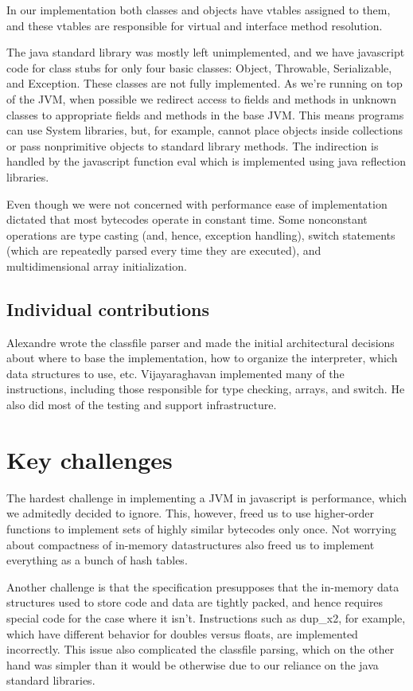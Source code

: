 \documentclass{article}
\begin{document}
In our implementation both classes and objects have vtables assigned
to them, and these vtables are responsible for virtual and interface
method resolution.

The java standard library was mostly left unimplemented, and we have
javascript code for class stubs for only four basic classes: Object,
Throwable, Serializable, and Exception. These classes are not fully
implemented. As we're running on top of the JVM, when possible we
redirect access to fields and methods in unknown classes to
appropriate fields and methods in the base JVM. This means programs
can use System libraries, but, for example, cannot place objects
inside collections or pass nonprimitive objects to standard library
methods. The indirection is handled by the javascript function eval
which is implemented using java reflection libraries.

Even though we were not concerned with performance ease of
implementation dictated that most bytecodes operate in constant
time. Some nonconstant operations are type casting (and, hence,
exception handling), switch statements (which are repeatedly
parsed every time they are executed), and multidimensional array
initialization.

\subsection{Individual contributions}
\label{sec:indiv-contr}

Alexandre wrote the classfile parser and made the initial
architectural decisions about where to base the implementation, how to
organize the interpreter, which data structures to use,
etc. Vijayaraghavan implemented many of the instructions, including
those responsible for type checking, arrays, and switch. He also did
most of the testing and support infrastructure.

\section{Key challenges}
\label{sec:key-challenges}

The hardest challenge in implementing a JVM in javascript is
performance, which we admitedly decided to ignore. This, however,
freed us to use higher-order functions to implement sets of highly
similar bytecodes only once. Not worrying about compactness of
in-memory datastructures also freed us to implement everything as a
bunch of hash tables.

Another challenge is that the specification presupposes that the
in-memory data structures used to store code and data are tightly
packed, and hence requires special code for the case where it
isn't. Instructions such as dup\_x2, for example, which have different
behavior for doubles versus floats, are implemented incorrectly. This
issue also complicated the classfile parsing, which on the other hand
was simpler than it would be otherwise due to our reliance on the java
standard libraries.
\end{document}
